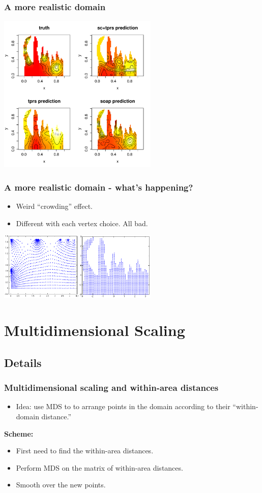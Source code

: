 \documentclass[ignorenonframetext]{beamer} %
\newcommand{\bc}{\begin{center}}
\newcommand{\ec}{\end{center}}
\newcommand{\bi}{\begin{itemize}}
\newcommand{\ei}{\end{itemize}}
\begin{document}
\begin{frame}
	\frametitle{A more realistic domain}
            \centering
              \includegraphics[width=3in]{figs/wigglytop2-real}\\
\end{frame}


\begin{frame}
	\frametitle{A more realistic domain - what's happening?}
	\bi
	\item Weird ``crowding'' effect.
	\item Different with each vertex choice. All bad.
	\ei

            \bc
              \includegraphics[width=3in]{figs/wt2-crowding.png}\\
            \ec
\end{frame}

\section{Multidimensional Scaling}

\subsection{Details}

\begin{frame}
	\frametitle{Multidimensional scaling and within-area distances}
       \bi
         \item Idea: use MDS to to arrange points in the domain according to their ``within-domain distance.''
         \ei
         \bc \textbf{Scheme:} \ec
         \bi
         \item First need to find the within-area distances.
         \item Perform MDS on the matrix of within-area distances.
         \item Smooth over the new points.

        \ei
\end{frame}
\end{document}
